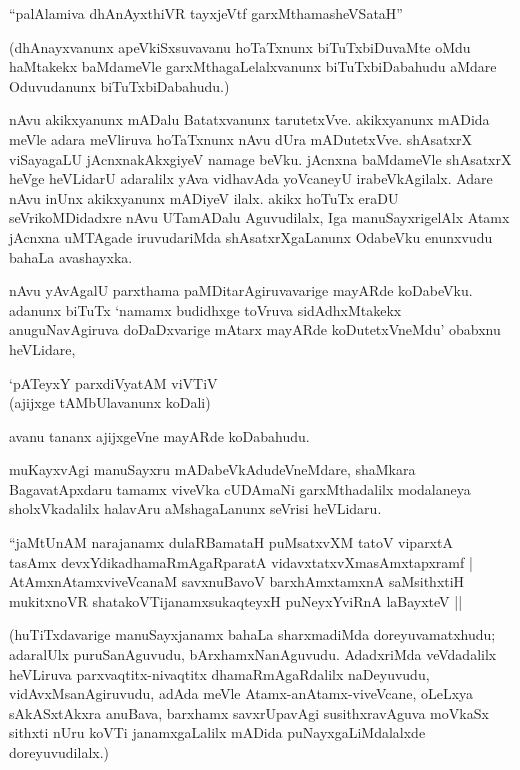 \begin{shloka}
``palAlamiva dhAnAyxthiVR tayxjeVtf garxMthamasheVSataH''
\end{shloka}

(dhAnayxvanunx apeVkiSxsuvavanu hoTaTxnunx biTuTxbiDuvaMte oMdu haMtakekx baMdameVle garxMthagaLelalxvanunx biTuTxbiDabahudu aMdare Oduvudanunx biTuTxbiDabahudu.)

nAvu akikxyanunx mADalu Batatxvanunx tarutetxVve. akikxyanunx mADida meVle adara meVliruva hoTaTxnunx nAvu dUra mADutetxVve. shAsatxrX viSayagaLU jAcnxnakAkxgiyeV namage beVku. jAcnxna baMdameVle shAsatxrX heVge heVLidarU adaralilx yAva vidhavAda yoVcaneyU irabeVkAgilalx. Adare nAvu inUnx akikxyanunx mADiyeV ilalx. akikx hoTuTx eraDU seVrikoMDidadxre nAvu UTamADalu Aguvudilalx, Iga manuSayxrigelAlx Atamx jAcnxna uMTAgade iruvudariMda shAsatxrXgaLanunx OdabeVku enunxvudu bahaLa avashayxka.

nAvu yAvAgalU parxthama paMDitarAgiruvavarige mayARde koDabeVku. adanunx biTuTx `namamx budidhxge toVruva sidAdhxMtakekx anuguNavAgiruva doDaDxvarige mAtarx mayARde koDutetxVneMdu' obabxnu heVLidare,

\begin{shloka}
`pATeyxY parxdiVyatAM viVTiV\\
(ajijxge tAMbUlavanunx koDali)
\end{shloka}

avanu tananx ajijxgeVne mayARde koDabahudu.

muKayxvAgi manuSayxru mADabeVkAdudeVneMdare, shaMkara BagavatApxdaru tamamx viveVka cUDAmaNi garxMthadalilx modalaneya sholxVkadalilx halavAru aMshagaLanunx seVrisi heVLidaru.

\begin{shloka}
``jaMtUnAM narajanamx dulaRBamataH puMsatxvXM tatoV viparxtA\\
tasAmx devxYdikadhamaRmAgaRparatA vidavxtatxvXmasAmxtapxramf |\\
AtAmxnAtamxviveVcanaM savxnuBavoV barxhAmxtamxnA saMsithxtiH\\
mukitxnoVR shatakoVTijanamxsukaqteyxH puNeyxYviRnA laBayxteV ||
\end{shloka}

(huTiTxdavarige manuSayxjanamx bahaLa sharxmadiMda doreyuvamatxhudu; adaralUlx puruSanAguvudu, bArxhamxNanAguvudu. AdadxriMda veVdadalilx heVLiruva parxvaqtitx-nivaqtitx dhamaRmAgaRdalilx naDeyuvudu, vidAvxMsanAgiruvudu, adAda meVle Atamx-anAtamx-viveVcane, oLeLxya sAkASxtAkxra anuBava, barxhamx savxrUpavAgi susithxravAguva moVkaSx sithxti nUru koVTi janamxgaLalilx mADida puNayxgaLiMdalalxde doreyuvudilalx.)

